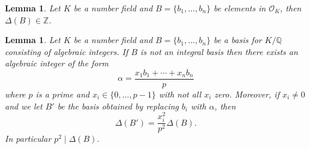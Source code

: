 \documentclass[11pt,a4paper]{amsart}
\theoremstyle{plain}
\newtheorem{lem}[subsection]{Lemma}
\theoremstyle{definition}
\theoremstyle{definition}
\newcommand{\ZZ}{\mathbb{Z}}
\def\QQ{\mathbb{Q}}
\def \a{\alpha}
\def \OO {\mathcal{O}}
\begin{document}
	\begin{lem}\label{lem: int basis int disc}
		Let $K$ be a number field and $B=\{b_1,\dots,b_n\}$ be elements in $\OO_K$, then $\Delta(B) \in \ZZ$.
	\end{lem}	
	
	\begin{lem}\label{lem: disc int basis}
		Let $K$ be a number field and $B=\{b_1,\dots,b_n\}$ be a basis for $K/\QQ$ consisting of algebraic integers. If $B$ is not an integral basis then there exists an algebraic integer of the form \[\a=\frac{x_1b_1+\cdots+x_nb_n}{p}\] where $p$ is a prime and $x_i \in \{0,\dots,p-1\}$ with not all $x_i$ zero. Moreover, if $x_i \neq 0$ and we let $B'$ be the basis obtained by replacing $b_i$ with $\a$, then \[\Delta(B')= \frac{x_i^2}{p^2} \Delta(B).\] In particular $p^2 \mid \Delta(B)$.
	\end{lem} 
	
\end{document}
